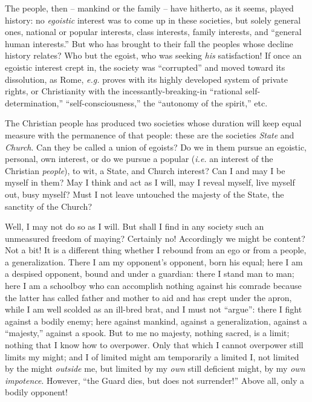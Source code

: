 \documentclass[12pt,a4paper]{book}
\begin{document}
The people, then -- mankind or the family -- have hitherto, as it seems, 
played history: no \textit{egoistic} interest was to come up in these 
societies, but solely general ones, national or popular interests, class 
interests, family interests, and ``general human interests.'' But who has 
brought to their fall the peoples whose decline history relates? Who but the 
egoist, who was seeking \textit{his} satisfaction! If once an egoistic 
interest crept in, the society was ``corrupted'' and moved toward its 
dissolution, as Rome, \textit{e.g.} proves with its highly developed system 
of private rights, or Christianity with the incessantly-breaking-in 
``rational self-determination,'' ``self-consciousness,'' the ``autonomy 
of the spirit,'' etc.

The Christian people has produced two societies whose duration will keep equal 
measure with the permanence of that people: these are the societies 
\textit{State} and \textit{Church}. Can they be called a union of egoists? Do 
we in them pursue an egoistic, personal, own interest, or do we pursue a 
popular (\textit{i.e.} an interest of the Christian \textit{people}), to wit, 
a State, and Church interest? Can I and may I be myself in them? May I think 
and act as I will, may I reveal myself, live myself out, busy myself? Must I 
not leave untouched the majesty of the State, the sanctity of the Church?

Well, I may not do so as I will. But shall I find in any society such an 
unmeasured freedom of maying? Certainly no! Accordingly we might be content? 
Not a bit! It is a different thing whether I rebound from an ego or from a 
people, a generalization. There I am my opponent's opponent, born his equal; 
here I am a despised opponent, bound and under a guardian: there I stand man 
to man; here I am a schoolboy who can accomplish nothing against his comrade 
because the latter has called father and mother to aid and has crept under the 
apron, while I am well scolded as an ill-bred brat, and I must not 
``argue'': there I fight against a bodily enemy; here against mankind, 
against a generalization, against a ``majesty,'' against a spook. But to me 
no majesty, nothing sacred, is a limit; nothing that I know how to overpower. 
Only that which I cannot overpower still limits my might; and I of limited 
might am temporarily a limited I, not limited by the might \textit{outside} 
me, but limited by my \textit{own} still deficient might, by my \textit{own 
impotence}. However, ``the Guard dies, but does not surrender!'' Above all, 
only a bodily opponent!
\end{document}
